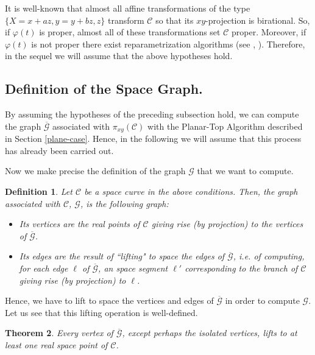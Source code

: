 \documentclass{elsart}
\newtheorem{theorem}{{\bf Theorem}}
\newtheorem{definition}[theorem]{{\bf Definition}}
\begin{document}
It is well-known that almost all affine transformations of the
type $\{X=x+az,y=y+bz,z\}$ transform ${\mathcal C}$
so that its $xy$-projection is birational. So,
if $\varphi(t)$ is proper, almost all of these transformations set
${\mathcal C}$ proper. Moreover, if $\varphi(t)$ is not proper
there exist reparametrization algorithms (see \cite{Tomas},
\cite{Seder}). Therefore, in the sequel we will assume that the
above hypotheses hold.

\subsection{Definition of the Space Graph.}\label{graph-3d}

By assuming the hypotheses of the preceding subsection hold, we
can compute the graph $\overline{\mathcal G}$ associated with
$\pi_{xy}({\mathcal C})$ with the Planar-Top Algorithm described
in Section \ref{plane-case}. Hence, in the following we will
assume that this process has already been carried out.

Now we make precise the definition of the graph ${\mathcal G}$
that we want to compute.

\begin{definition} \label{graph-assoc-3d}
Let ${\mathcal C}$ be a space curve in the above conditions. Then, the {\sf graph associated with ${\mathcal C}$}, ${\mathcal G}$, is the following graph:
\begin{itemize}
\item [(i)] Its vertices are the real points of ${\mathcal C}$ giving rise (by projection) to the vertices of $\overline{\mathcal G}$.
    \item [(ii)] Its edges are the result of ``lifting" to space the edges of $\overline{\mathcal G}$, i.e. of computing, for each edge $\ell$ of $\overline{\mathcal G}$, an space segment $\ell'$ corresponding to the branch of ${\mathcal C}$ giving rise (by projection) to $\ell$.
        \end{itemize}
        \end{definition}

        Hence, we have to lift to space the vertices and edges of $\overline{\mathcal G}$ in order to compute ${\mathcal G}$. Let us see that this lifting operation is well-defined.


\begin{theorem} \label{th-vert-lift}
Every vertex of $\overline{\mathcal G}$, except perhaps the isolated vertices, lifts to at least one real space point of ${\mathcal C}$.
\end{theorem}
\end{document}
